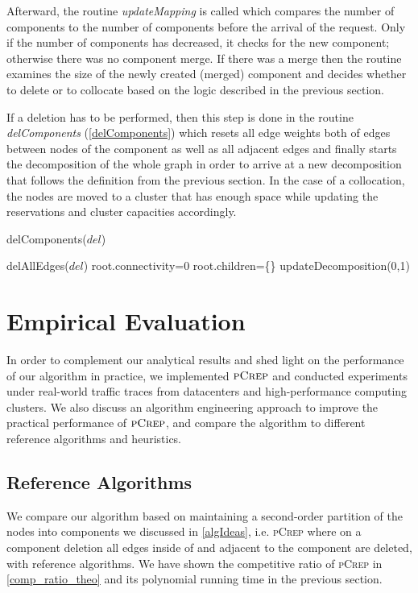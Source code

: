 \documentclass[a4paper,UKenglish,cleveref, autoref, thm-restate,authorcolumns]{lipics-v2019}
\newcommand{\adjDel}{\textsc{pCrep}}
\begin{document}
Afterward, the routine \textit{updateMapping} is called which compares the number of components to the number of components before the arrival of the request. Only if the number of components has decreased, it checks for the new component; otherwise there was no component merge. 
If there was a merge then the routine examines the size of the newly created (merged) component and decides whether to delete or to collocate based on the logic described in the previous section.

If a deletion has to be performed, then this step is done in the routine \textit{delComponents} (\cref{delComponents}) which resets all edge weights both of edges between nodes of the component as well as all adjacent edges and finally starts the decomposition of the whole graph in order to arrive at a new decomposition that follows the definition from the previous section.
In the case of a collocation, the nodes are moved to a cluster that has enough space while updating the reservations and cluster capacities accordingly.



\begin{algorithm}
	\caption{delComponents($del$)}
	\label{delComponents}
	\begin{algorithmic}
		\STATE delAllEdges($del$)
		\STATE root.connectivity=0
		\STATE root.children=\{\}
		\STATE updateDecomposition(0,1)
	\end{algorithmic}
\end{algorithm}

\section{Empirical Evaluation}
\label{sec:evaluation}

In order to complement our analytical results and shed light
on the performance of our algorithm in practice, 
we implemented $\adjDel$ and conducted experiments
under real-world traffic traces from datacenters
and high-performance computing clusters. 
We also discuss an algorithm engineering approach to improve the practical
performance of $\adjDel$, and compare the algorithm to different reference algorithms
and heuristics.

\subsection{Reference Algorithms}
\label{algSection}

We compare our algorithm based on maintaining a second-order partition of the nodes into components we discussed in \cref{algIdeas}, 
i.e. \adjDel{} where on a component deletion all edges inside of and adjacent to the component are deleted, with reference algorithms. 
We have shown the competitive ratio of \adjDel{} in \cref{comp_ratio_theo} and its polynomial running time in the previous section.
\end{document}

